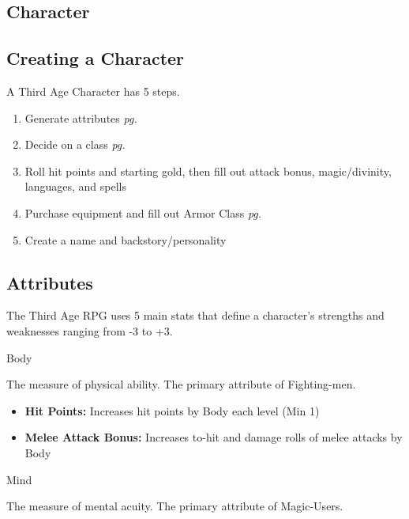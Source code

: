 \begin{multicols}{2}
\section*{Character}
\subsection*{Creating a Character}
A Third Age Character has 5 
steps.
\begin{enumerate}
\setlength\itemsep{0em}
	\item Generate attributes \emph{pg. \pageref{label:Attributes}}
	\item Decide on a class \emph{pg. \pageref{label:Class}}
	\item Roll hit points and starting gold, then fill out attack bonus, magic/divinity, languages, and spells
	\item Purchase equipment and fill out Armor Class \emph{pg. \pageref{section:Equipment}}
	\item Create a name and backstory/personality %
\end{enumerate}


\subsection*{Attributes}
\label{label:Attributes}
The Third Age RPG uses 5 main stats that define a character's strengths and weaknesses ranging from -3 to +3. 

\begin{mercHeading}
Body
\end{mercHeading}
The measure of physical ability. The primary attribute of Fighting-men.

\begin{itemize}
	\setlength\itemsep{0em}
	\item \textbf{Hit Points:} Increases hit points by Body each level (Min 1)
	\item \textbf{Melee Attack Bonus:} Increases to-hit and damage rolls of melee attacks by Body
\end{itemize}

\begin{mercHeading}
Mind
\end{mercHeading}
The measure of mental acuity. The primary attribute of Magic-Users.


\end{multicols}
